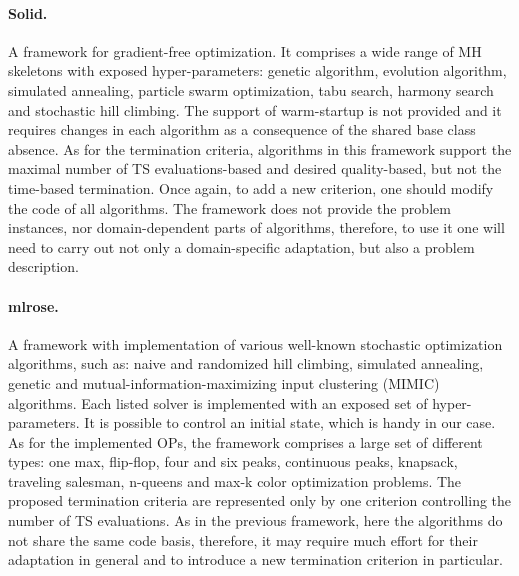 \paragraph{Solid.} A framework for gradient-free optimization. It comprises a wide range of MH skeletons with exposed hyper-parameters: genetic algorithm, evolution algorithm, simulated annealing, particle swarm optimization, tabu search, harmony search and stochastic hill climbing. The support of warm-startup is not provided and it requires changes in each algorithm as a consequence of the shared base class absence. As for the termination criteria, algorithms in this framework support the maximal number of TS evaluations-based and desired quality-based, but not the time-based termination. Once again, to add a new criterion, one should modify the code of all algorithms. The framework does not provide the problem instances, nor domain-dependent parts of algorithms, therefore, to use it one will need to carry out not only a domain-specific adaptation, but also a problem description.

\paragraph{mlrose.} A framework with implementation of various well-known stochastic optimization algorithms, such as: naive and randomized hill climbing, simulated annealing, genetic and mutual-information-maximizing input clustering (MIMIC) algorithms. Each listed solver is implemented with an exposed set of hyper-parameters. It is possible to control an initial state, which is handy in our case. As for the implemented OPs, the framework comprises a large set of different types: one max, flip-flop, four and six peaks, continuous peaks, knapsack, traveling salesman, n-queens and max-k color optimization problems. The proposed termination criteria are represented only by one criterion controlling the number of TS evaluations. As in the previous framework, here the algorithms do not share the same code basis, therefore, it may require much effort for their adaptation in general and to introduce a new termination criterion in particular.

